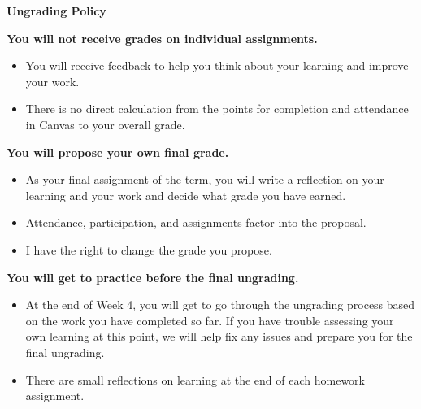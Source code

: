 \documentclass[]{article}
\begin{document}
\newpage
\begin{PresentSpace}
\begin{center}
	\textbf{Ungrading Policy}
\end{center}
\textbf{You will not receive grades on individual assignments.}
\begin{itemize}
	\item You will receive feedback to help you think about your learning and improve your work.
	\item There is no direct calculation from the points for completion and attendance in Canvas to your overall grade.
\end{itemize}
\textbf{You will propose your own final grade.}
\begin{itemize}
	\item As your final assignment of the term, you will write a reflection on your learning and your work and decide what grade you have earned.
	\item Attendance, participation, and assignments factor into the proposal.
	\item I have the right to change the grade you propose.
\end{itemize}
\textbf{You will get to practice before the final ungrading.}
\begin{itemize}
	\item At the end of Week 4, you will get to go through the ungrading process based on the work you have completed so far. If you have trouble assessing your own learning at this point, we will help fix any issues and prepare you for the final ungrading.
	\item There are small reflections on learning at the end of each homework assignment.
\end{itemize}
\end{PresentSpace}
\newpage
\end{document}
